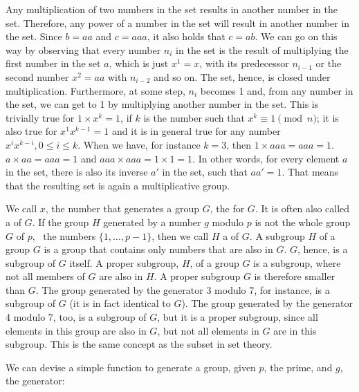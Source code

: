 \documentclass{scrreprt}
\begin{document}
Any multiplication of two numbers
in the set results in another number in the set.
Therefore, any power of a number in the set
will result in another number in the set.
Since $b = aa$ and $c = aaa$, it also holds
that $c = ab$. We can go on this way
by observing that every number $n_i$ in the set 
is the result of multiplying the first
number in the set $a$, which is just $x^1 = x$,
with its predecessor $n_{i-1}$ or
the second number $x^2 = aa$ with $n_{i-2}$
and so on.
The set, hence, is closed under multiplication.
Furthermore, at some step, $n_i$ becomes 1
and, from any number in the set,
we can get to 1 by multiplying another number
in the set.
This is trivially true for $1 \times x^k = 1$,
if $k$ is the number such that $x^k \equiv 1 \pmod{n}$;
it is also true for $x^1x^{k-1} = 1$ and
it is in general true for any number 
$x^ix^{k-i}, 0\le i\le k$.
When we have, for instance $k=3$, then
$1 \times aaa = aaa = 1$.
$a \times aa = aaa = 1$ and
$aaa \times aaa = 1 \times 1 = 1$.
In other words, for every element $a$ in the set,
there is also its inverse $a'$ in the set,
such that $aa' = 1$.
That means that the resulting set
is again a multiplicative group.

We call $x$, the number that generates a group $G$,
the  for $G$. It is often also called
a  of $G$.
If the group $H$ generated by a number $g$
modulo $p$ is not the whole group $G$ of $p$,
\ie\ the numbers $\lbrace 1,\dots,p-1\rbrace$,
then we call $H$ a  of $G$.
A subgroup $H$ of a group $G$ is a group
that contains only numbers that are also in $G$. 
$G$, hence, is a subgroup of $G$ itself.
A proper subgroup, $H$, of a group $G$ 
is a subgroup, where not all members of $G$ 
are also in $H$. A proper subgroup $G$ is
therefore smaller than $G$. 
The group generated by the generator 3 modulo 7,
for instance, is a subgroup of $G$
(it is in fact identical to $G$). 
The group generated by the generator 4 modulo 7,
too, is a subgroup of $G$, but it is a proper subgroup,
since all elements in this group are also in $G$,
but not all elements in $G$ are in this subgroup.
This is the same concept as the subset 
in set theory.

We can devise a simple function
to generate a group, given $p$, the prime,
and $g$, the generator:
\end{document}
